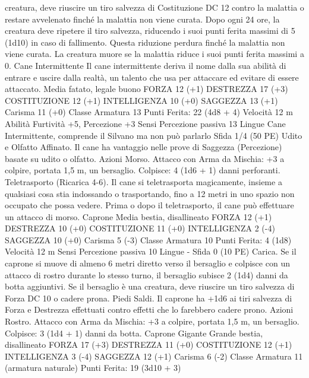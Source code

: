 \begin{multicols}{2}
creatura, deve riuscire un tiro salvezza di Costituzione DC 12
contro la malattia o restare avvelenato finché la malattia non
viene curata. Dopo ogni 24 ore, la creatura deve ripetere il tiro
salvezza, riducendo i suoi punti ferita massimi di 5 (1d10) in
caso di fallimento. Questa riduzione perdura finché la malattia
non viene curata. La creatura muore se la malattia riduce i suoi
punti ferita massimi a 0.
Cane Intermittente
Il cane intermittente deriva il nome dalla sua abilità di
entrare e uscire dalla realtà, un talento che usa per
attaccare ed evitare di essere attaccato.
Media fatato, legale buono
FORZA 12 (+1)
DESTREZZA 17 (+3)
COSTITUZIONE 12 (+1)
INTELLIGENZA 10 (+0)
SAGGEZZA 13 (+1)
Carisma 11 (+0)
Classe Armatura 13
\hspace*{0pt}\hfill{Punti Ferita}: 22 (4d8 + 4)
Velocità 12 m
Abilità Furtività +5, Percezione +3
Sensi Percezione passiva 13
Lingue Cane Intermittente, comprende il Silvano ma non può
parlarlo
Sfida 1/4 (50 PE)
Udito e Olfatto Affinato. Il cane ha vantaggio nelle prove di
Saggezza (Percezione) basate su udito o olfatto.
Azioni
Morso. Attacco con Arma da Mischia: +3 a colpire, portata 1,5
m, un bersaglio.
Colpisce: 4 (1d6 + 1) danni perforanti.
Teletrasporto (Ricarica 4-6). Il cane si teletrasporta
magicamente, insieme a qualsiasi cosa stia indossando o
trasportando, fino a 12 metri in uno spazio non occupato che
possa vedere. Prima o dopo il teletrasporto, il cane può effettuare
un attacco di morso.
Caprone
Media bestia, disallineato
FORZA 12 (+1)
DESTREZZA 10 (+0)
COSTITUZIONE 11 (+0)
INTELLIGENZA 2 (-4)
SAGGEZZA 10 (+0)
Carisma 5 (-3)
Classe Armatura 10
\hspace*{0pt}\hfill{Punti Ferita}: 4 (1d8)
Velocità 12 m
Sensi Percezione passiva 10
Lingue -
Sfida 0 (10 PE)
Carica. Se il caprone si muove di almeno 6 metri diretto verso il
bersaglio e colpisce con un attacco di rostro durante lo stesso
turno, il bersaglio subisce 2 (1d4) danni da botta aggiuntivi.
Se il bersaglio è una creatura, deve riuscire un tiro salvezza di
Forza DC 10 o cadere prona.
Piedi Saldi. Il caprone ha +1d6 ai tiri salvezza di Forza e
Destrezza effettuati contro effetti che lo farebbero cadere prono.
Azioni
Rostro. Attacco con Arma da Mischia: +3 a colpire, portata 1,5
m, un bersaglio.
Colpisce: 3 (1d4 + 1) danni da botta.
Caprone Gigante
Grande bestia, disallineato
FORZA 17 (+3)
DESTREZZA 11 (+0)
COSTITUZIONE 12 (+1)
INTELLIGENZA 3 (-4)
SAGGEZZA 12 (+1)
Carisma 6 (-2)
Classe Armatura 11 (armatura naturale)
\hspace*{0pt}\hfill{Punti Ferita}: 19 (3d10 + 3)

\end{multicols}
